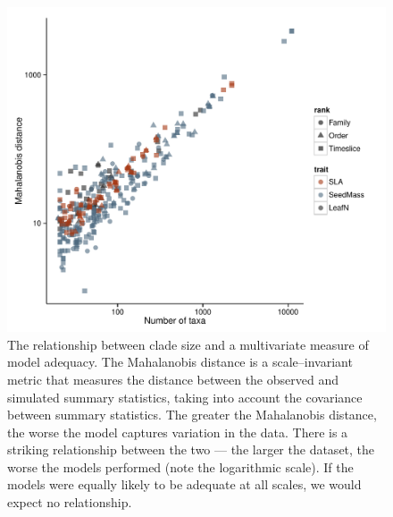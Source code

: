 \documentclass[a4paper,12pt]{article}
\begin{document}
\begin{figure}[p]
  \centering
  \includegraphics[scale=0.9]{figs/Size-adequacy-ML-bestonly}
  \caption{The relationship between clade size and a multivariate measure of model adequacy. The Mahalanobis distance is a scale--invariant metric that measures the distance between the observed and simulated summary statistics, taking into account the covariance between summary statistics. The greater the Mahalanobis distance, the worse the model captures variation in the data. There is a striking relationship between the two --- the larger the dataset, the worse the models performed (note the logarithmic scale). If the models were equally likely to be adequate at all scales, we would expect no relationship.}
  \label{fig:size-adequacy}
\end{figure}

\renewcommand\thefigure{Box\arabic{figure}}
\renewcommand\thetable{Box \arabic{table}}
\setcounter{figure}{0}    
\setcounter{table}{0} 
\end{document}
